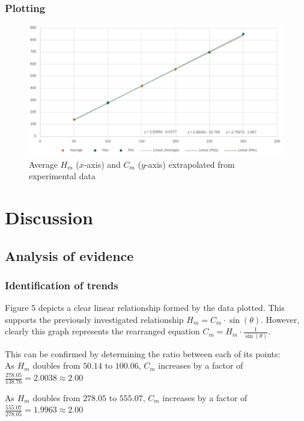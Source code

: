 \documentclass[11pt,a4paper]{article}
\begin{document}
\subsubsection{Plotting}

\begin{figure}[H]
\centering
\includegraphics[width=0.8\paperwidth]{newresults.png}
\caption{Average $H_m$ ($x$-axis) and $C_m$ ($y$-axis) extrapolated from experimental data}
\end{figure}




\section{Discussion}
\subsection{Analysis of evidence}
\subsubsection{Identification of trends}
Figure 5 depicts a clear linear relationship formed by the data plotted. This supports the previously investigated relationship  $H_m=C_m\cdot{\sin(\theta)}$. However, clearly this graph represents the rearranged equation $C_m=H_m\cdot \frac{1}{{\sin(\theta)}}$.

\newpage
This can be confirmed by determining the ratio between each of its points:
\\

As $H_m$ doubles from $50.14$ to $100.06$, $C_m$ increases by a factor of $\frac{278.05}{138.76}=2.0038\approx2.00$

As $H_m$ doubles from $278.05$ to $555.07$, $C_m$ increases by a factor of $\frac{555.07}{278.05}=1.9963\approx2.00$
\end{document}
